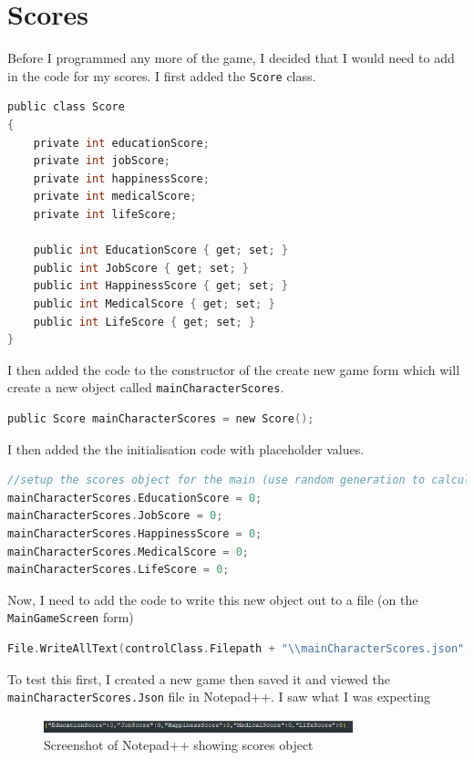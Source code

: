 \section{Scores}
Before I programmed any more of the game, I decided that I would need to add in the code for my scores. I first added the \verb|Score| class.
\begin{lstlisting}[language=c, style=csharp, caption=Score class]
public class Score
{
    private int educationScore;
    private int jobScore;
    private int happinessScore;
    private int medicalScore;
    private int lifeScore;

    public int EducationScore { get; set; }
    public int JobScore { get; set; }
    public int HappinessScore { get; set; }
    public int MedicalScore { get; set; }
    public int LifeScore { get; set; }
}
\end{lstlisting}
I then added the code to the constructor of the create new game form which will create a new object called \verb|mainCharacterScores|.
\begin{lstlisting}[language=c, style=csharp, caption=Declaration of the mainCharacterScores object]
public Score mainCharacterScores = new Score();
\end{lstlisting}
I then added the the initialisation code with placeholder values.
\begin{lstlisting}[language=c, style=csharp, caption=Setting the score values to placeholder values]
//setup the scores object for the main (use random generation to calculate values)
mainCharacterScores.EducationScore = 0;
mainCharacterScores.JobScore = 0;
mainCharacterScores.HappinessScore = 0;
mainCharacterScores.MedicalScore = 0;
mainCharacterScores.LifeScore = 0;
\end{lstlisting}
Now, I need to add the code to write this new object out to a file (on the \verb|MainGameScreen| form)
\begin{lstlisting}[language=c, style=csharp, caption=Code to write the Scores object out to a file]
File.WriteAllText(controlClass.Filepath + "\\mainCharacterScores.json", JsonConvert.SerializeObject(mainCharacterScores));
\end{lstlisting}
To test this first, I created a new game then saved it and viewed the \verb|mainCharacterScores.Json| file in Notepad++. I saw what I was expecting
\begin{figure}[H]
    \centering
    \includegraphics[width=0.8\textwidth]{images/implementation/scoresTest1.png}
    \caption{Screenshot of Notepad++ showing scores object}
    \label{fig:implementation-scoresTest1}
\end{figure}
